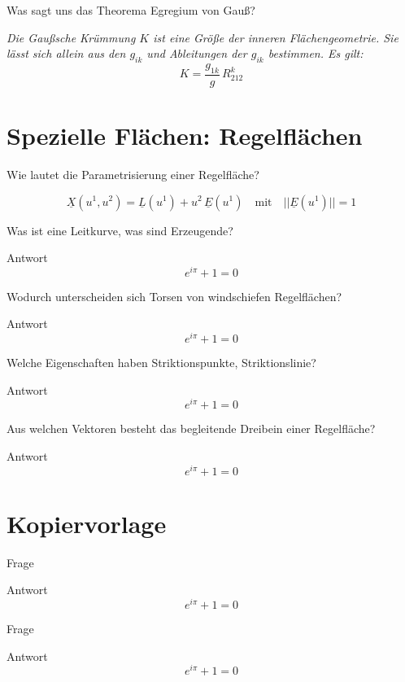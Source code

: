\documentclass[twocolumn, fontsize=8pt, DIV=1]{scrartcl}
\begin{document}
\begin{framed}
    Was sagt uns das Theorema Egregium von Gauß?
\end{framed}
\textit{Die Gaußsche Krümmung $K$ ist eine Größe der inneren Flächengeometrie. Sie lässt sich allein aus den $g_{ik}$ und Ableitungen der $g_{ik}$ bestimmen. Es gilt:}
\[
    K = \frac{g_{1k}}{g} \, R_{212}^k
\]











\section{Spezielle Flächen: Regelflächen}



\begin{framed}
    Wie lautet die Parametrisierung einer Regelfläche?
\end{framed}
\[
    \underline{X}(u^1, u^2) = \underline{L}(u^1) + u^2\, \underline{E}(u^1)
    \quad \text{mit} \quad ||\underline{E}(u^1)|| = 1
\]



\begin{framed}
    Was ist eine Leitkurve, was sind Erzeugende?
\end{framed}
Antwort
\[
    e^{i\pi} + 1 = 0
\]



\begin{framed}
    Wodurch unterscheiden sich Torsen von windschiefen Regelflächen?
\end{framed}
Antwort
\[
    e^{i\pi} + 1 = 0
\]



\begin{framed}
    Welche Eigenschaften haben Striktionspunkte, Striktionslinie?
\end{framed}
Antwort
\[
    e^{i\pi} + 1 = 0
\]



\begin{framed}
    Aus welchen Vektoren besteht das begleitende Dreibein einer Regelfläche?
\end{framed}
Antwort
\[
    e^{i\pi} + 1 = 0
\]



\section*{Kopiervorlage}

\begin{framed}
    Frage
\end{framed}
Antwort
\[
    e^{i\pi} + 1 = 0
\]



\begin{framed}
    Frage
\end{framed}
Antwort
\[
    e^{i\pi} + 1 = 0
\]



\listoftodos
\end{document}
